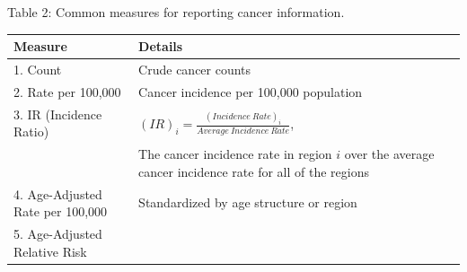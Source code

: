 \documentclass{monashthesis}
\begin{document}
Table 2: Common measures for reporting cancer information.

\begin{longtable}[]{@{}ll@{}}
\toprule
\begin{minipage}[b]{0.28\columnwidth}\raggedright
Measure\strut
\end{minipage} & \begin{minipage}[b]{0.66\columnwidth}\raggedright
Details\strut
\end{minipage}\tabularnewline
\midrule
\endhead
\begin{minipage}[t]{0.28\columnwidth}\raggedright
1. Count\strut
\end{minipage} & \begin{minipage}[t]{0.66\columnwidth}\raggedright
Crude cancer counts\strut
\end{minipage}\tabularnewline
\begin{minipage}[t]{0.28\columnwidth}\raggedright
2. Rate per 100,000\strut
\end{minipage} & \begin{minipage}[t]{0.66\columnwidth}\raggedright
Cancer incidence per 100,000 population\strut
\end{minipage}\tabularnewline
\begin{minipage}[t]{0.28\columnwidth}\raggedright
3. IR (Incidence Ratio)\strut
\end{minipage} & \begin{minipage}[t]{0.66\columnwidth}\raggedright
\((IR)_i=\frac{(Incidence\ Rate)_i}{Average\ Incidence\ Rate}\),\strut
\end{minipage}\tabularnewline
\begin{minipage}[t]{0.28\columnwidth}\raggedright
\strut
\end{minipage} & \begin{minipage}[t]{0.66\columnwidth}\raggedright
The cancer incidence rate in region \(i\) over the average cancer incidence rate for all of the regions\strut
\end{minipage}\tabularnewline
\begin{minipage}[t]{0.28\columnwidth}\raggedright
4. Age-Adjusted Rate per 100,000\strut
\end{minipage} & \begin{minipage}[t]{0.66\columnwidth}\raggedright
Standardized by age structure or region\strut
\end{minipage}\tabularnewline
\begin{minipage}[t]{0.28\columnwidth}\raggedright
5. Age-Adjusted Relative Risk\strut

\end{minipage}
\end{longtable}
\end{document}
